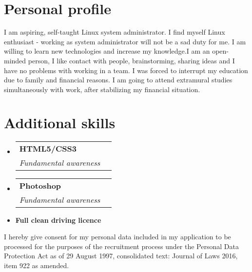 \documentclass[letterpaper,11pt]{article}
\makeatletter
\newcommand{\CvSubHeadingListStart}{\begin{itemize}[leftmargin=*]}
\newcommand{\CvSubHeadingListEnd}{\end{itemize}}
\newcommand{\CvSkillsSubheading}[2]{
  \vspace{-1pt}\item
    \begin{tabular*}{0.97\textwidth}{l@{\extracolsep{\fill}}r}
      \textbf{#1} \\
      \textit{\small#2} 
    \end{tabular*}\vspace{-5pt}
}
\makeatother
\begin{document}
\section{Personal profile}

\textbf{}{I am aspiring, self-taught Linux system administrator. I find myself Linux enthusiast - working as system administrator will not be a sad duty for me. I am willing to learn new technologies and increase my knowledge.\break I am an open-minded person, I like contact with people, brainstorming, sharing ideas and I have no problems with working in a team. I was forced to interrupt my education due to family and financial reasons. I am going to attend extramural studies simultaneously with work, after stabilizing my financial situation.}

\vspace{5mm}

\section{Additional skills}
  \CvSubHeadingListStart

    \CvSkillsSubheading
      {HTML5/CSS3}
      {Fundamental awareness}
      
    \CvSkillsSubheading
      {Photoshop}
      {Fundamental awareness}
     
    \item{
      \textbf{Full clean driving licence}{}
    }
\CvSubHeadingListEnd

\vspace{8mm}

\hfill \break
\scriptsize {I hereby give consent for my personal data included in my application to be processed for the purposes of the recruitment process under the Personal Data Protection Act as of 29 August 1997, consolidated text: Journal of Laws 2016, item 922 as amended.}
\end{document}

